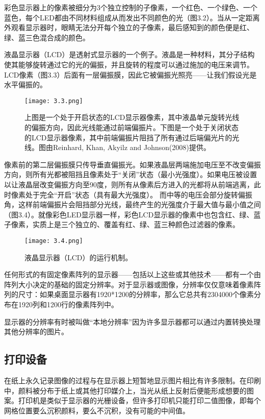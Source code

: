 \documentclass[lang=cn,12pt]{elegantbook}
\begin{document}
彩色显示器上的像素被细分为3个独立控制的子像素，一个红色、一个绿色、一个蓝色，每个LED都由不同材料组成从而发出不同颜色的光（图3.2）。当从一定距离外观看显示器时，眼睛无法分开每个独立的子像素，最后感知到的颜色便是红、绿、蓝三色混合成的颜色。

液晶显示器（LCD）是透射式显示器的一个例子。液晶是一种材料，其分子结构使其能够旋转通过它的光的偏振，并且旋转的程度可以通过施加的电压来调节。LCD像素（图3.3）后面有一层偏振膜，因此它被偏振光照亮——让我们假设光是水平偏振的。

\begin{figure}[htb]
  \centering
  \texttt{[image: 3.3.png]}
  \caption{上图是一个处于开启状态的LCD显示器像素，其中液晶单元旋转光线的偏振方向，因此光线能通过前端偏振片。下图是一个处于关闭状态的LCD显示器像素，其中前端偏振片阻挡了所有通过后端偏光片的光线。图由Reinhard, Khan, Akyilz and Johnson(2008)提供。}
\end{figure}

像素前的第二层偏振膜只传导垂直偏振光。如果液晶层两端施加电压至不改变偏振方向，则所有光都被阻挡且像素处于“关闭”状态（最小光强度）。如果电压被设置以让液晶层改变偏振方向至90度，则所有从像素后方进入的光都将从前端逃离，此时像素处于完全“开启”状态（具有最大光强度）。 而中等的电压会部分旋转偏振角，这样前端偏振片会阻挡部分光线，最终产生的光强度介于最大值与最小值之间（图3.4）。就像彩色LED显示器一样，彩色LCD显示器的像素中也包含红、绿、蓝子像素，实质上是三个独立的、覆盖有红、绿、蓝三种颜色过滤器的像素。

\begin{figure}[htb]
  \centering
  \texttt{[image: 3.4.png]}
  \caption{液晶显示器（LCD）的运行机制。}
\end{figure}

任何形式的有固定像素阵列的显示器——包括以上这些或其他技术——都有一个由阵列大小决定的基础的固定分辨率。对于显示器或图像，分辨率仅仅意味着像素阵列的尺寸：如果桌面显示器有1920*1200的分辨率，那么它总共有2304000个像素分布在1920列和1200行的像素阵列中。

\begin{note}
  显示器的分辨率有时被叫做“本地分辨率”因为许多显示器都可以通过内置转换处理其他分辨率的图片。
\end{note}

\subsection{打印设备}

在纸上永久记录图像的过程与在显示器上短暂地显示图片相比有许多限制。在印刷中，颜料被分布于纸上或其他打印媒介上，当光从纸上反射后便能形成想要的图案。打印机是类似于显示器的光栅设备，但许多打印机只能打印二值图像，即每个网格位置要么沉积颜料，要么不沉积，没有可能的中间值。
\end{document}
